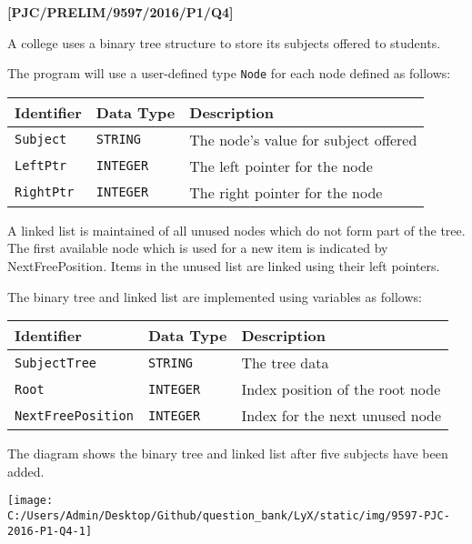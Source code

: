 \item \textbf{{[}PJC/PRELIM/9597/2016/P1/Q4{]} }

A college uses a binary tree structure to store its subjects offered
to students. 

The program will use a user-defined type \texttt{Node} for each node
defined as follows: 
\begin{center}
\begin{tabular}{|l|l|l|}
\hline 
\texttt{\hspace{0.01\columnwidth}}Identifier & \texttt{\hspace{0.01\columnwidth}}Data Type & \texttt{\hspace{0.05\columnwidth}}Description\tabularnewline
\hline 
\texttt{Subject} & \texttt{STRING} & The node's value for subject offered\tabularnewline
\hline 
\texttt{LeftPtr} & \texttt{INTEGER} & The left pointer for the node\tabularnewline
\hline 
\texttt{RightPtr} & \texttt{INTEGER} & The right pointer for the node\tabularnewline
\hline 
\end{tabular}
\par\end{center}

A linked list is maintained of all unused nodes which do not form
part of the tree. The first available node which is used for a new
item is indicated by NextFreePosition. Items in the unused list are
linked using their left pointers. 

The binary tree and linked list are implemented using variables as
follows: 
\begin{center}
\begin{tabular}{|l|l|l|}
\hline 
\texttt{\hspace{0.01\columnwidth}}Identifier & \texttt{\hspace{0.01\columnwidth}}Data Type & \texttt{\hspace{0.05\columnwidth}}Description\tabularnewline
\hline 
\texttt{SubjectTree} & \texttt{STRING} & The tree data\tabularnewline
\hline 
\texttt{Root} & \texttt{INTEGER} & Index position of the root node\tabularnewline
\hline 
\texttt{NextFreePosition} & \texttt{INTEGER} & Index for the next unused node\tabularnewline
\hline 
\end{tabular}
\par\end{center}

The diagram shows the binary tree and linked list after five subjects
have been added.
\begin{center}
\texttt{[image: C:/Users/Admin/Desktop/Github/question\_bank/LyX/static/img/9597-PJC-2016-P1-Q4-1]}
\par\end{center}

